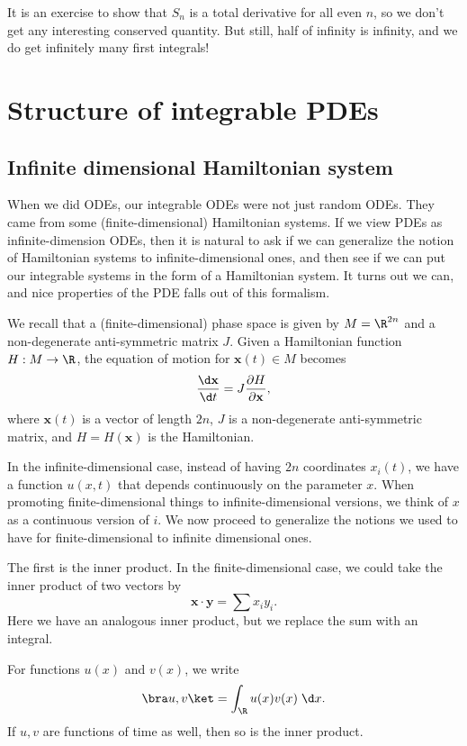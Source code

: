 \documentclass[a4paper]{article}
\begin{document}
It is an exercise to show that $S_n$ is a total derivative for all even $n$, so we don't get any interesting conserved quantity. But still, half of infinity is infinity, and we do get infinitely many first integrals!

\section{Structure of integrable PDEs}
\subsection{Infinite dimensional Hamiltonian system}
When we did ODEs, our integrable ODEs were not just random ODEs. They came from some (finite-dimensional) Hamiltonian systems. If we view PDEs as infinite-dimension ODEs, then it is natural to ask if we can generalize the notion of Hamiltonian systems to infinite-dimensional ones, and then see if we can put our integrable systems in the form of a Hamiltonian system. It turns out we can, and nice properties of the PDE falls out of this formalism.

We recall that a (finite-dimensional) phase space is given by $M = \R^{2n}$ and a non-degenerate anti-symmetric matrix $J$. Given a Hamiltonian function $H: M \to \R$, the equation of motion for $\mathbf{x}(t) \in M$ becomes
\[
  \frac{\d \mathbf{x}}{\d t} = J \frac{\partial H}{\partial \mathbf{x}},
\]
where $\mathbf{x}(t)$ is a vector of length $2n$, $J$ is a non-degenerate anti-symmetric matrix, and $H = H(\mathbf{x})$ is the Hamiltonian.

In the infinite-dimensional case, instead of having $2n$ coordinates $x_i(t)$, we have a function $u(x, t)$ that depends continuously on the parameter $x$. When promoting finite-dimensional things to infinite-dimensional versions, we think of $x$ as a continuous version of $i$. We now proceed to generalize the notions we used to have for finite-dimensional to infinite dimensional ones.

The first is the inner product. In the finite-dimensional case, we could take the inner product of two vectors by
\[
  \mathbf{x}\cdot \mathbf{y} = \sum x_i y_i.
\]
Here we have an analogous inner product, but we replace the sum with an integral.
\begin{notation}
  For functions $u(x)$ and $v(x)$, we write
  \[
    \bra u, v\ket = \int_\R u(x) v(x)\;\d x.
  \]
  If $u, v$ are functions of time as well, then so is the inner product.
\end{notation}
\end{document}
